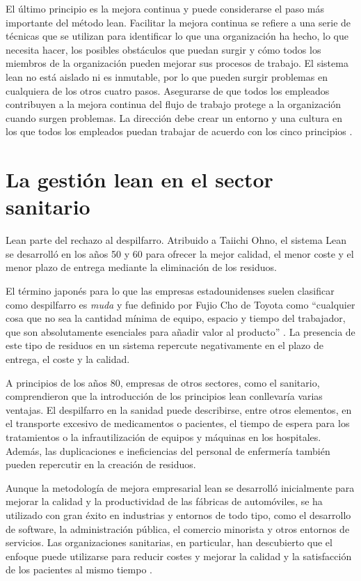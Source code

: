 El último principio es la mejora continua y puede considerarse el paso más importante del método lean.
Facilitar la mejora continua se refiere a una serie de técnicas que se utilizan para identificar lo que una organización ha hecho, lo que necesita hacer, los posibles obstáculos que puedan surgir y cómo todos los miembros de la organización pueden mejorar sus procesos de trabajo.
El sistema lean no está aislado ni es inmutable, por lo que pueden surgir problemas en cualquiera de los otros cuatro pasos.
Asegurarse de que todos los empleados contribuyen a la mejora continua del flujo de trabajo protege a la organización cuando surgen problemas.
La dirección debe crear un entorno y una cultura en los que todos los empleados puedan trabajar de acuerdo con los cinco principios \cite{ohno_toyota_1988,bertagnolli_lean_2018}.

\section{La gestión lean en el sector sanitario}

Lean parte del rechazo al despilfarro. Atribuido a Taiichi Ohno, el sistema Lean se desarrolló en los años 50 y 60 para ofrecer la mejor calidad, el menor coste y el menor plazo de entrega mediante la eliminación de los residuos.

El término japonés para lo que las empresas estadounidenses suelen clasificar como despilfarro es \textit{muda} y fue definido por Fujio Cho de Toyota como ``cualquier cosa que no sea la cantidad mínima de equipo, espacio y tiempo del trabajador, que son absolutamente esenciales para añadir valor al producto'' \cite{helmold_lean_2020}.
La presencia de este tipo de residuos en un sistema repercute negativamente en el plazo de entrega, el coste y la calidad.

A principios de los años 80, empresas de otros sectores, como el sanitario, comprendieron que la introducción de los principios lean conllevaría varias ventajas.
El despilfarro en la sanidad puede describirse, entre otros elementos, en el transporte excesivo de medicamentos o pacientes, el tiempo de espera para los tratamientos o la infrautilización de equipos y máquinas en los hospitales. Además, las duplicaciones e ineficiencias del personal de enfermería también pueden repercutir en la creación de residuos.

Aunque la metodología de mejora empresarial lean se desarrolló inicialmente para mejorar la calidad y la productividad de las fábricas de automóviles, se ha utilizado con gran éxito en industrias y entornos de todo tipo, como el desarrollo de software, la administración pública, el comercio minorista y otros entornos de servicios.
Las organizaciones sanitarias, en particular, han descubierto que el enfoque puede utilizarse para reducir costes y mejorar la calidad y la satisfacción de los pacientes al mismo tiempo \cite{millard_how_nodate}.

